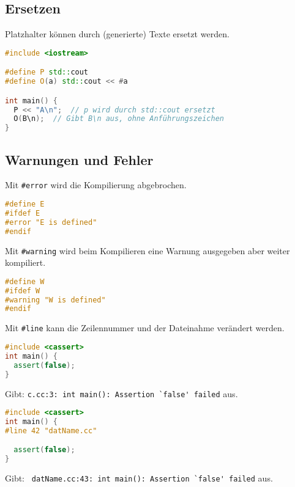 \subsection{Ersetzen}

Platzhalter können durch (generierte) Texte ersetzt werden.

\begin{lstlisting}[language=C++]
#include <iostream>

#define P std::cout
#define O(a) std::cout << #a

int main() {
  P << "A\n";  // p wird durch std::cout ersetzt
  O(B\n);  // Gibt B\n aus, ohne Anführungszeichen
}
\end{lstlisting}

\subsection{Warnungen und Fehler}

Mit \lstinline|#error| wird die Kompilierung abgebrochen.

\begin{lstlisting}[language=C++]
#define E
#ifdef E
#error "E is defined"
#endif
\end{lstlisting}

Mit \lstinline|#warning| wird beim Kompilieren eine Warnung ausgegeben aber
weiter kompiliert.

\begin{lstlisting}[language=C++]
#define W
#ifdef W
#warning "W is defined"
#endif
\end{lstlisting}

Mit \lstinline|#line| kann die Zeilennummer und der Dateinahme verändert werden.

\begin{lstlisting}[language=C++]
#include <cassert>
int main() {
  assert(false);
}
\end{lstlisting}

Gibt: \lstinline|c.cc:3: int main(): Assertion `false' failed| aus.

\begin{lstlisting}[language=C++]
#include <cassert>
int main() {
#line 42 "datName.cc"

  assert(false);
}
\end{lstlisting}

Gibt: \lstinline| datName.cc:43: int main(): Assertion `false' failed|
aus.

